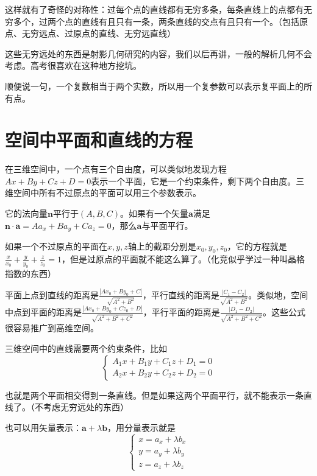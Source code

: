 这样就有了奇怪的对称性：过每个点的直线都有无穷多条，每条直线上的点都有无穷多个，过两个点的直线有且只有一条，两条直线的交点有且只有一个。（包括原点、无穷远点、过原点的直线、无穷远直线）

这些无穷远处的东西是射影几何研究的内容，我们以后再讲，一般的解析几何不会考虑。高考很喜欢在这种地方挖坑。

顺便说一句，一个复数相当于两个实数，所以用一个复参数可以表示复平面上的所有点。
\section{空间中平面和直线的方程}
在三维空间中，一个点有三个自由度，可以类似地发现方程$A x+B y+C z+D=0$表示一个平面，它是一个约束条件，剩下两个自由度。三维空间中所有不过原点的平面可以用三个参数表示。

它的法向量$\mathbf{n}$平行于$(A,B,C)$。如果有一个矢量$\mathbf{a}$满足$\mathbf{n} \cdot \mathbf{a}=A a_x+B a_y+C a_z=0$，那么$\mathbf{a}$与平面平行。

如果一个不过原点的平面在$x,y,z$轴上的截距分别是$x_0,y_0,z_0$，它的方程就是$\frac{x}{x_0}+\frac{y}{y_0}+\frac{z}{z_0}=1$，但是过原点的平面就不能这么算了。（化竞似乎学过一种叫晶格指数的东西）

平面上点到直线的距离是$\frac{|A x_0+B y_0+C|}{\sqrt{A^2+B^2}}$，平行直线的距离是$\frac{|C_1-C_2|}{\sqrt{A^2+B^2}}$。类似地，空间中点到平面的距离是$\frac{|A x_0+B y_0+C z_0+D|}{\sqrt{A^2+B^2+C^2}}$，平行平面的距离是$\frac{|D_1-D_2|}{\sqrt{A^2+B^2+C^2}}$。这些公式很容易推广到高维空间。

三维空间中的直线需要两个约束条件，比如
\begin{equation*}
\begin{cases}
A_1 x+B_1 y+C_1 z+D_1=0 \\
A_2 x+B_2 y+C_2 z+D_2=0
\end{cases}
\end{equation*}

也就是两个平面相交得到一条直线。但是如果这两个平面平行，就不能表示一条直线了。（不考虑无穷远处的东西）

也可以用矢量表示：$\mathbf{a}+\lambda \mathbf{b}$，用分量表示就是
\begin{equation*}
\begin{cases}
x=a_x+\lambda b_x \\
y=a_y+\lambda b_y \\
z=a_z+\lambda b_z
\end{cases}
\end{equation*}

